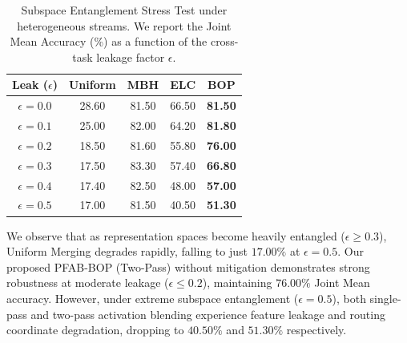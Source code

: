 \begin{table}[h]
  \caption{Subspace Entanglement Stress Test under heterogeneous streams. We report the Joint Mean Accuracy (\%) as a function of the cross-task leakage factor $\epsilon$.}
  \label{tab:entanglement}
  \vskip 0.15in
  \begin{center}
  \begin{small}
  \begin{sc}
  \setlength{\tabcolsep}{4pt}
  \begin{tabular}{ccccc}
    \toprule
    Leak ($\epsilon$) & Uniform & MBH & ELC & BOP \\
    \midrule
    $\epsilon = 0.0$ & 28.60 & 81.50 & 66.50 & \textbf{81.50} \\
    $\epsilon = 0.1$ & 25.00 & 82.00 & 64.20 & \textbf{81.80} \\
    $\epsilon = 0.2$ & 18.50 & 81.60 & 55.80 & \textbf{76.00} \\
    $\epsilon = 0.3$ & 17.50 & 83.30 & 57.40 & \textbf{66.80} \\
    $\epsilon = 0.4$ & 17.40 & 82.50 & 48.00 & \textbf{57.00} \\
    $\epsilon = 0.5$ & 17.00 & 81.50 & 40.50 & \textbf{51.30} \\
    \bottomrule
  \end{tabular}
  \end{sc}
  \end{small}
  \end{center}
  \vskip -0.1in
  \end{table}

  We observe that as representation spaces become heavily entangled ($\epsilon \ge 0.3$), Uniform Merging degrades rapidly, falling to just $17.00\%$ at $\epsilon = 0.5$. Our proposed \textsc{PFAB-BOP} (Two-Pass) without mitigation demonstrates strong robustness at moderate leakage ($\epsilon \le 0.2$), maintaining $76.00\%$ Joint Mean accuracy. However, under extreme subspace entanglement ($\epsilon = 0.5$), both single-pass and two-pass activation blending experience feature leakage and routing coordinate degradation, dropping to $40.50\%$ and $51.30\%$ respectively.

